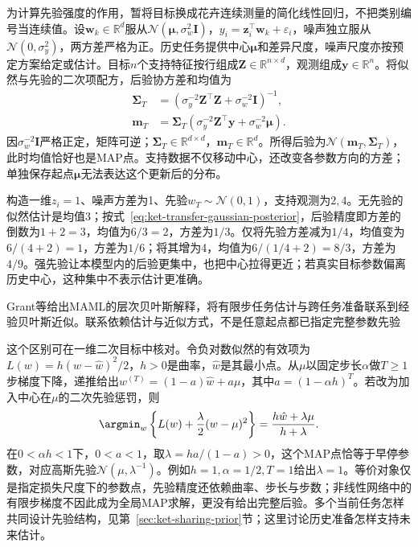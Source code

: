 为计算先验强度的作用，暂将目标换成花卉连续测量的简化线性回归，不把类别编号当连续值。设$\bm w_k\in\mathbb R^d$服从$\mathcal N(\bm\mu,\sigma_w^2\bm I)$，$y_i=\bm z_i^\top\bm w_k+\varepsilon_i$，噪声独立服从$\mathcal N(0,\sigma_y^2)$，两方差严格为正。历史任务提供中心$\bm\mu$和差异尺度，噪声尺度亦按预定方案给定或估计。目标$n$个支持特征按行组成$\bm Z\in\mathbb R^{n\times d}$，观测组成$\bm y\in\mathbb R^n$。将似然与先验的二次项配方，后验协方差和均值为
\begin{align}
  \bm\Sigma_T
    &=\left(\sigma_y^{-2}\bm Z^\top\bm Z
                     +\sigma_w^{-2}\bm I\right)^{-1}, \nonumber\\
  \bm m_T
    &=\bm\Sigma_T\left(\sigma_y^{-2}\bm Z^\top\bm y
                     +\sigma_w^{-2}\bm\mu\right).
  \label{eq:ket-transfer-gaussian-posterior}
\end{align}
因$\sigma_w^{-2}\bm I$严格正定，矩阵可逆；$\bm\Sigma_T\in\mathbb R^{d\times d}$，$\bm m_T\in\mathbb R^d$。所得后验为$\mathcal N(\bm m_T,\bm\Sigma_T)$，此时均值恰好也是MAP点。支持数据不仅移动中心，还改变各参数方向的方差；单独保存起点$\bm\mu$无法表达这个更新后的分布。

\begin{example}[先验怎样改变少样本估计]
  \label{ex:ket-transfer-prior-numeric}
  构造一维$z_i=1$、噪声方差为1、先验$w_T\sim\mathcal N(0,1)$，支持观测为$2,4$。无先验的似然估计是均值3；按式~\eqref{eq:ket-transfer-gaussian-posterior}，后验精度即方差的倒数为$1+2=3$，均值为$6/3=2$，方差为$1/3$。仅将先验方差减为$1/4$，均值变为$6/(4+2)=1$，方差为$1/6$；将其增为4，均值为$6/(1/4+2)=8/3$，方差为$4/9$。强先验让本模型内的后验更集中，也把中心拉得更近；若真实目标参数偏离历史中心，这种集中不表示估计更准确。
\end{example}

Grant等给出MAML的层次贝叶斯解释，将有限步任务估计与跨任务准备联系到经验贝叶斯近似。联系依赖估计与近似方式，不是任意起点都已指定完整参数先验

这个区别可在一维二次目标中核对。令负对数似然的有效项为$L(w)=h(w-\hat w)^2/2$，$h>0$是曲率，$\hat w$是其最小点。从$\mu$以固定步长$\alpha$做$T\ge1$步梯度下降，递推给出$w^{(T)}=(1-a)\hat w+a\mu$，其中$a=(1-\alpha h)^T$。若改为加入中心在$\mu$的二次先验惩罚，则
\[
  \argmin_w\left\{L(w)+\frac{\lambda}{2}(w-\mu)^2\right\}
    =\frac{h\hat w+\lambda\mu}{h+\lambda}.
\]
在$0<\alpha h<1$下，$0<a<1$，取$\lambda=ha/(1-a)>0$，这个MAP点恰等于早停参数，对应高斯先验$\mathcal N(\mu,\lambda^{-1})$。例如$h=1,\alpha=1/2,T=1$给出$\lambda=1$。等价对象仅是指定损失尺度下的参数点，先验精度还依赖曲率、步长与步数；非线性网络中的有限步梯度不因此成为全局MAP求解，更没有给出完整后验。多个当前任务怎样共同设计先验结构，见第~\ref{sec:ket-sharing-prior}节；这里讨论历史准备怎样支持未来估计。

